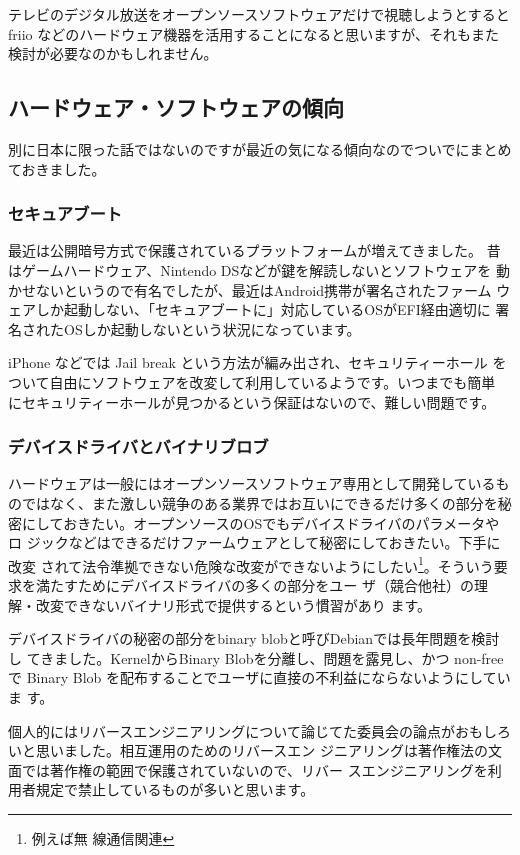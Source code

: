 \documentclass[mingoth,a4paper]{jsarticle}
\begin{document}
テレビのデジタル放送をオープンソースソフトウェアだけで視聴しようとすると
friio などのハードウェア機器を活用することになると思いますが、それもまた
検討が必要なのかもしれません。

\subsection{ハードウェア・ソフトウェアの傾向}

別に日本に限った話ではないのですが最近の気になる傾向なのでついでにまとめ
ておきました。

\subsubsection{セキュアブート}

最近は公開暗号方式で保護されているプラットフォームが増えてきました。
昔はゲームハードウェア、Nintendo DSなどが鍵を解読しないとソフトウェアを
動かせないというので有名でしたが、最近はAndroid携帯が署名されたファーム
ウェアしか起動しない、「セキュアブートに」対応しているOSがEFI経由適切に
署名されたOSしか起動しないという状況になっています。

iPhone などでは Jail break という方法が編み出され、セキュリティーホール
をついて自由にソフトウェアを改変して利用しているようです。いつまでも簡単
にセキュリティーホールが見つかるという保証はないので、難しい問題です。

\subsubsection{デバイスドライバとバイナリブロブ}

ハードウェアは一般にはオープンソースソフトウェア専用として開発しているも
のではなく、また激しい競争のある業界ではお互いにできるだけ多くの部分を秘
密にしておきたい。オープンソースのOSでもデバイスドライバのパラメータやロ
ジックなどはできるだけファームウェアとして秘密にしておきたい。下手に改変
されて法令準拠できない危険な改変ができないようにしたい\footnote{例えば無
線通信関連}。そういう要求を満たすためにデバイスドライバの多くの部分をユー
ザ（競合他社）の理解・改変できないバイナリ形式で提供するという慣習があり
ます。

デバイスドライバの秘密の部分をbinary blobと呼びDebianでは長年問題を検討し
てきました。KernelからBinary Blobを分離し、問題を露見し、かつ non-free で
Binary Blob を配布することでユーザに直接の不利益にならないようにしていま
す。

個人的にはリバースエンジニアリングについて論じてた委員会の論点がおもしろ
いと思いました。\cite{bunka-reverse-eng2008}相互運用のためのリバースエン
ジニアリングは著作権法の文面では著作権の範囲で保護されていないので、リバー
スエンジニアリングを利用者規定で禁止しているものが多いと思います。
\end{document}
